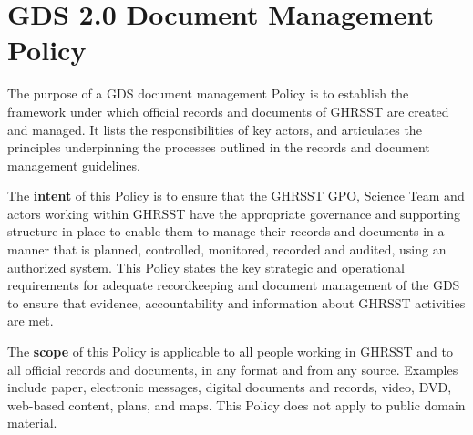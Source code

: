 \pagebreak
\section{GDS 2.0 Document Management Policy}
The purpose of a GDS document management Policy is to establish the framework under which
official records and documents of GHRSST are created and managed. It lists the responsibilities of
key actors, and articulates the principles underpinning the processes outlined in the records and
document management guidelines.
\newp

The \textbf{intent} of this Policy is to ensure that the GHRSST GPO, Science Team and actors working
within GHRSST have the appropriate governance and supporting structure in place to enable them to
manage their records and documents in a manner that is planned, controlled, monitored, recorded
and audited, using an authorized system.
This Policy states the key strategic and operational requirements for adequate recordkeeping and
document management of the GDS to ensure that evidence, accountability and information about
GHRSST activities are met.
\newp

The \textbf{scope} of this Policy is applicable to all people working in GHRSST and to all official records and
documents, in any format and from any source. Examples include paper, electronic messages, digital
documents and records, video, DVD, web-based content, plans, and maps. This Policy does not
apply to public domain material.
\newp 

